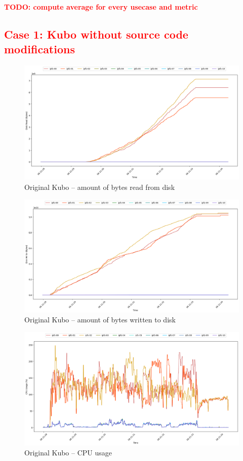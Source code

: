 \textcolor{red}{\textbf{TODO: compute average for every usecase and metric}}\\

\subsection{\textcolor{red}{Case 1: Kubo without source code modifications}}

\begin{figure}[H]
\includegraphics[width=\linewidth]{figures/original/blk_read.png}
\caption{Original Kubo -- amount of bytes read from disk}
\end{figure}
\begin{figure}[H]
\includegraphics[width=\linewidth]{figures/original/blk_write.png}
\caption{Original Kubo -- amount of bytes written to disk}
\end{figure}
\begin{figure}[H]
\includegraphics[width=\linewidth]{figures/original/cpu_usage.png}
\caption{Original Kubo -- CPU usage}
\end{figure}
